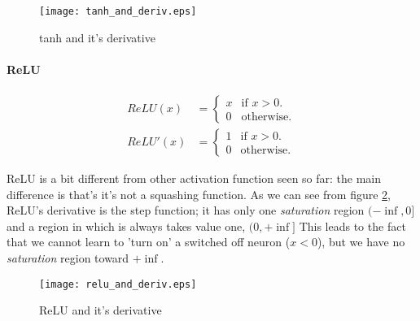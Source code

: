\begin{figure}[h]
  \centering
    \texttt{[image: tanh\_and\_deriv.eps]}
  \caption{tanh and it's derivative}
\label{tanh_plot}
\end{figure}

\paragraph{ReLU}


\begin{align}
  ReLU(x)&=\begin{cases}
    x & \text{if $x>0$}.\\
    0 & \text{otherwise}.
  \end{cases} \\ 
   ReLU'(x)&=\begin{cases}
    1 & \text{if $x>0$}.\\
    0 & \text{otherwise}.
  \end{cases}
\end{align}


ReLU is a bit different from other activation function seen so far: the main difference is that's it's not a squashing function.
As we can see from figure \ref{relu_plot}, ReLU's derivative is the step function; it has only one \textit{saturation} region $(-\inf, 0]$ and a region in which is always takes value one, $(0,+\inf]$
This leads to the fact that we cannot learn to 'turn on' a switched off neuron ($x<0$), but we have no \textit{saturation} region toward $+\inf$.

\begin{figure}[h]
  \centering
    \texttt{[image: relu\_and\_deriv.eps]}
  \caption{ReLU and it's derivative}
\label{relu_plot}
\end{figure}
